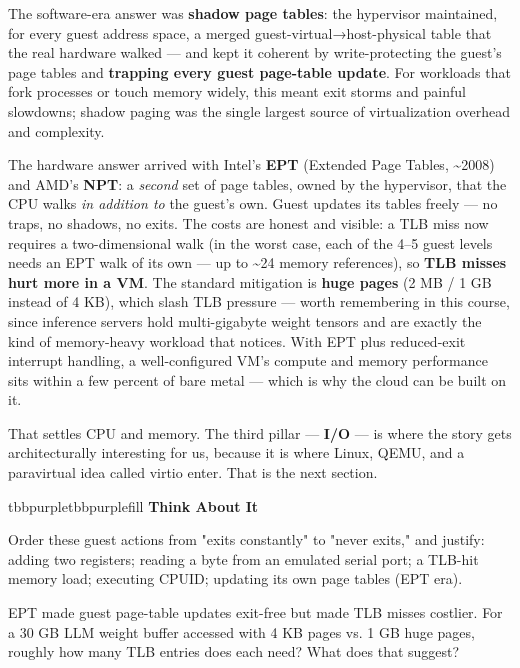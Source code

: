 The software-era answer was \textbf{shadow page tables}: the hypervisor maintained, for every guest address space, a merged guest-virtual→host-physical table that the real hardware walked — and kept it coherent by write-protecting the guest's page tables and \textbf{trapping every guest page-table update}. For workloads that fork processes or touch memory widely, this meant exit storms and painful slowdowns; shadow paging was the single largest source of virtualization overhead and complexity.

The hardware answer arrived with Intel's \textbf{EPT} (Extended Page Tables, \textasciitilde{}2008) and AMD's \textbf{NPT}: a \textit{second} set of page tables, owned by the hypervisor, that the CPU walks \textit{in addition to} the guest's own. Guest updates its tables freely — no traps, no shadows, no exits. The costs are honest and visible: a TLB miss now requires a two-dimensional walk (in the worst case, each of the 4–5 guest levels needs an EPT walk of its own — up to \textasciitilde{}24 memory references), so \textbf{TLB misses hurt more in a VM}. The standard mitigation is \textbf{huge pages} (2 MB / 1 GB instead of 4 KB), which slash TLB pressure — worth remembering in this course, since inference servers hold multi-gigabyte weight tensors and are exactly the kind of memory-heavy workload that notices. With EPT plus reduced-exit interrupt handling, a well-configured VM's compute and memory performance sits within a few percent of bare metal — which is why the cloud can be built on it.

That settles CPU and memory. The third pillar — \textbf{I/O} — is where the story gets architecturally interesting for us, because it is where Linux, QEMU, and a paravirtual idea called virtio enter. That is the next section.

\begin{calloutbox}{tbbpurple}{tbbpurplefill}
{\normalsize\bfseries\color{tbbpurple}Think About It}\par\vspace{3pt}
\begin{tbbitemize}
  \item Order these guest actions from "exits constantly" to "never exits," and justify: adding two registers; reading a byte from an emulated serial port; a TLB-hit memory load; executing CPUID; updating its own page tables (EPT era).
  \item EPT made guest page-table updates exit-free but made TLB misses costlier. For a 30 GB LLM weight buffer accessed with 4 KB pages vs. 1 GB huge pages, roughly how many TLB entries does each need? What does that suggest?
\end{tbbitemize}
\end{calloutbox}

